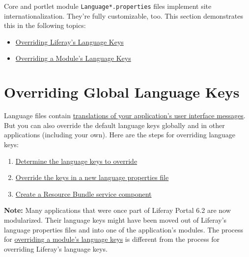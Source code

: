 Core and portlet module \texttt{Language*.properties} files implement
site internationalization. They're fully customizable, too. This section
demonstrates this in the following topics:

\begin{itemize}
\tightlist
\item
  \href{/docs/7-2/customization/-/knowledge_base/c/overriding-language-keys}{Overriding
  Liferay's Language Keys}
\item
  \href{/docs/7-2/customization/-/knowledge_base/c/overriding-a-modules-language-keys}{Overriding
  a Module's Language Keys}
\end{itemize}

\chapter{Overriding Global Language
Keys}\label{overriding-global-language-keys}

Language files contain
\href{/docs/7-2/frameworks/-/knowledge_base/f/localizing-your-application}{translations
of your application's user interface messages}. But you can also
override the default language keys globally and in other applications
(including your own). Here are the steps for overriding language keys:

\begin{enumerate}
\def\labelenumi{\arabic{enumi}.}
\tightlist
\item
  \hyperref[determine-the-language-keys-to-override]{Determine the
  language keys to override}
\item
  \hyperref[override-the-keys-in-a-new-language-properties-file]{Override
  the keys in a new language properties file}
\item
  \hyperref[create-a-resource-bundle-service-component]{Create a
  Resource Bundle service component}
\end{enumerate}

\noindent\hrulefill

\textbf{Note:} Many applications that were once part of Liferay Portal
6.2 are now modularized. Their language keys might have been moved out
of Liferay's language properties files and into one of the application's
modules. The process for
\href{/docs/7-2/customization/-/knowledge_base/c/overriding-a-modules-language-keys}{overriding
a module's language keys} is different from the process for overriding
Liferay's language keys.

\noindent\hrulefill

